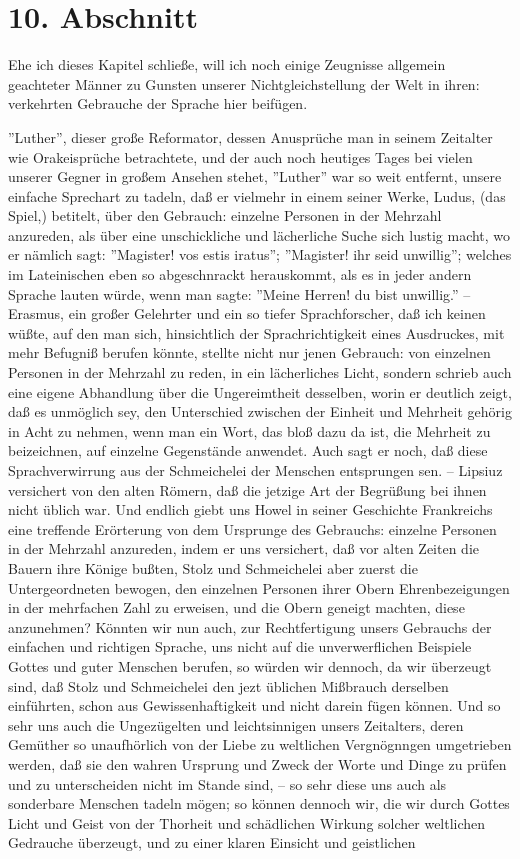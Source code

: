 \section{10. Abschnitt}

Ehe ich dieses Kapitel schließe, will ich noch einige Zeugnisse allgemein geachteter Männer zu Gunsten unserer Nichtgleichstellung der Welt in ihren: verkehrten Gebrauche der Sprache hier beifügen.

''Luther'', dieser große Reformator, dessen Anusprüche man in seinem Zeitalter wie Orakeisprüche betrachtete, und der auch noch heutiges Tages bei vielen unserer Gegner in großem Ansehen stehet, ''Luther'' war so weit entfernt, unsere einfache Sprechart zu tadeln, daß er vielmehr in einem seiner Werke, Ludus, (das Spiel,) betitelt, über den Gebrauch: einzelne Personen in der Mehrzahl anzureden, als über eine unschickliche und lächerliche Suche sich lustig macht, wo er nämlich sagt: ''Magister! vos estis iratus''; ''Magister! ihr seid unwillig''; welches im Lateinischen eben so abgeschnrackt herauskommt, als es in jeder andern Sprache lauten würde, wenn man sagte: ''Meine Herren! du bist unwillig.'' -- Erasmus, ein großer Gelehrter und ein so tiefer Sprachforscher, daß ich keinen wüßte, auf den man sich, hinsichtlich der Sprachrichtigkeit eines Ausdruckes, mit mehr Befugniß berufen könnte, stellte nicht nur jenen Gebrauch: von einzelnen Personen in der Mehrzahl zu reden, in ein lächerliches Licht, sondern schrieb auch eine eigene Abhandlung über die Ungereimtheit desselben, worin er deutlich zeigt, daß es unmöglich sey, den Unterschied zwischen der Einheit und Mehrheit gehörig in Acht zu nehmen, wenn man ein Wort, das bloß dazu da ist, die Mehrheit zu beizeichnen, auf einzelne Gegenstände anwendet. Auch sagt er noch, daß diese Sprachverwirrung aus der Schmeichelei der Menschen entsprungen sen. -- Lipsiuz versichert von den alten Römern, daß die jetzige Art der Begrüßung bei ihnen nicht üblich war. Und endlich giebt uns Howel in seiner Geschichte Frankreichs eine treffende Erörterung von dem Ursprunge des Gebrauchs: einzelne Personen in der Mehrzahl anzureden, indem er uns versichert, daß vor alten Zeiten die Bauern ihre Könige bußten, Stolz und Schmeichelei aber zuerst die Untergeordneten bewogen, den einzelnen Personen ihrer Obern Ehrenbezeigungen in der mehrfachen Zahl zu erweisen, und die Obern geneigt machten, diese anzunehmen? Könnten wir nun auch, zur Rechtfertigung unsers Gebrauchs der einfachen und richtigen Sprache, uns nicht auf die unverwerflichen Beispiele Gottes und guter Menschen berufen, so würden wir dennoch, da wir überzeugt sind, daß Stolz und Schmeichelei den jezt üblichen Mißbrauch derselben einführten, schon aus Gewissenhaftigkeit und nicht darein fügen können. Und so sehr uns auch die Ungezügelten und leichtsinnigen unsers Zeitalters, deren Gemüther so unaufhörlich von der Liebe zu weltlichen Vergnögnngen umgetrieben werden, daß sie den wahren Ursprung und Zweck der Worte und Dinge zu prüfen und zu unterscheiden nicht im Stande sind, -- so sehr diese uns auch als sonderbare Menschen tadeln mögen; so können dennoch wir, die wir durch Gottes Licht und Geist von der Thorheit und schädlichen Wirkung solcher weltlichen Gedrauche überzeugt, und zu einer klaren Einsicht und geistlichen 